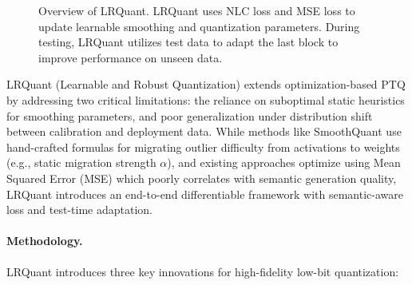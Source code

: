\begin{figure}[htbp]
{{%
    }}
    \caption{Overview of LRQuant. LRQuant uses NLC loss and MSE loss to update learnable smoothing and quantization parameters. During testing, LRQuant utilizes test data to adapt the last block to improve performance on unseen data.}
    \label{fig:lrquant} 
\end{figure}

LRQuant (Learnable and Robust Quantization) extends optimization-based PTQ by addressing two critical limitations: the reliance on suboptimal static heuristics for smoothing parameters, and poor generalization under distribution shift between calibration and deployment data. While methods like SmoothQuant use hand-crafted formulas for migrating outlier difficulty from activations to weights (e.g., static migration strength $\alpha$), and existing approaches optimize using Mean Squared Error (MSE) which poorly correlates with semantic generation quality, LRQuant introduces an end-to-end differentiable framework with semantic-aware loss and test-time adaptation.

\paragraph{Methodology.}
LRQuant introduces three key innovations for high-fidelity low-bit quantization:


